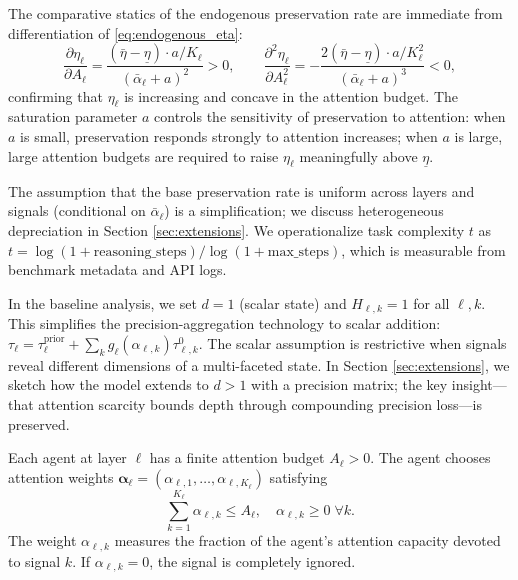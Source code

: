 The comparative statics of the endogenous preservation rate are immediate from differentiation of \eqref{eq:endogenous_eta}:
\begin{equation}\label{eq:eta_comp_statics}
\frac{\partial \eta_\ell}{\partial A_\ell} = \frac{(\bar{\eta} - \underline{\eta}) \cdot a / K_\ell}{(\bar{\alpha}_\ell + a)^2} > 0, \qquad
\frac{\partial^2 \eta_\ell}{\partial A_\ell^2} = -\frac{2(\bar{\eta} - \underline{\eta}) \cdot a / K_\ell^2}{(\bar{\alpha}_\ell + a)^3} < 0,
\end{equation}
confirming that $\eta_\ell$ is increasing and concave in the attention budget. The saturation parameter $a$ controls the sensitivity of preservation to attention: when $a$ is small, preservation responds strongly to attention increases; when $a$ is large, large attention budgets are required to raise $\eta_\ell$ meaningfully above $\underline{\eta}$.

The assumption that the base preservation rate is uniform across layers and signals (conditional on $\bar{\alpha}_\ell$) is a simplification; we discuss heterogeneous depreciation in Section \ref{sec:extensions}. We operationalize task complexity $t$ as $t = \log(1 + \text{reasoning\_steps}) / \log(1 + \text{max\_steps})$, which is measurable from benchmark metadata and API logs.

\begin{remark}\label{rem:scalar}
In the baseline analysis, we set $d = 1$ (scalar state) and $H_{\ell,k} = 1$ for all $\ell, k$. This simplifies the precision-aggregation technology to scalar addition: $\tau_\ell = \tau_{\ell}^{\text{prior}} + \sum_k g_\ell(\alpha_{\ell,k}) \tau^0_{\ell,k}$. The scalar assumption is restrictive when signals reveal different dimensions of a multi-faceted state. In Section \ref{sec:extensions}, we sketch how the model extends to $d > 1$ with a precision matrix; the key insight---that attention scarcity bounds depth through compounding precision loss---is preserved.
\end{remark}

\begin{assumption}\label{ass:attention_budget}
Each agent at layer $\ell$ has a finite attention budget $A_\ell > 0$. The agent chooses attention weights $\boldsymbol{\alpha}_\ell = (\alpha_{\ell,1}, \ldots, \alpha_{\ell,K_\ell})$ satisfying
\begin{equation}\label{eq:budget_constraint}
\sum_{k=1}^{K_\ell} \alpha_{\ell,k} \leq A_\ell, \quad \alpha_{\ell,k} \geq 0 \; \forall k.
\end{equation}
The weight $\alpha_{\ell,k}$ measures the fraction of the agent's attention capacity devoted to signal $k$. If $\alpha_{\ell,k} = 0$, the signal is completely ignored.
\end{assumption}

